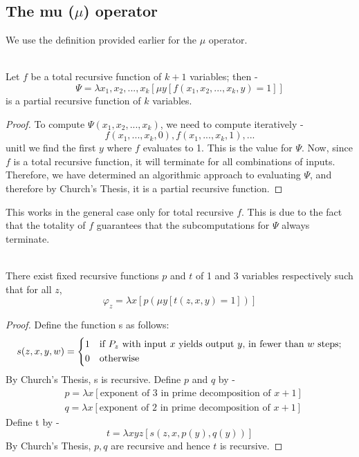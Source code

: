 \documentclass[openany]{book}
\begin{document}
\subsection{The mu ($\mu$) operator}
We use the definition provided earlier for the $\mu$ operator. 
\begin{mytheorem}
     \\ 
    Let $f$ be a total recursive function of $k+1$ variables; then - 
    $$\varPsi = \lambda x_1, x_2, ..., x_k[\mu y[f(x_1, x_2, ..., x_k, y) = 1]]$$
    is a partial recursive function of $k$ variables.
\end{mytheorem}
\begin{proof}
To compute $\varPsi(x_1, x_2, ..., x_k)$, we need to compute iteratively - 
$$f(x_1, ..., x_k, 0), f(x_1, ..., x_k, 1), ...$$
unitl we find the first $y$ where $f$ evaluates to 1. This is the value for $\varPsi$. Now, since $f$ is a total recursive function, it will terminate for all combinations of inputs. Therefore, we have determined an algorithmic approach to evaluating $\varPsi$, and therefore by Church's Thesis, it is a partial recursive function. 
\end{proof}
\begin{mynote}
    This works in the general case only for total recursive $f$. This is due to the fact that the totality of $f$ guarantees that the subcomputations for $\varPsi$ always terminate.  
\end{mynote}
\begin{mytheorem}
     \\
    There exist fixed recursive functions $p$ and $t$ of 1 and 3 variables respectively such that for all $z$, 
    $$\varphi_z = \lambda x[p(\mu y[t(z, x, y) = 1])]$$
\end{mytheorem}
\begin{proof}
    Define the function s as follows:
    $$s(z, x, y, w) = \begin{dcases}
        1 & \text{if $P_z$ with input $x$ yields output $y$, in fewer than $w$ steps;} \\
        0 & \text{otherwise}
    \end{dcases}$$
    By Church's Thesis, s is recursive. Define $p$ and $q$ by - 
    \begin{align*}
        &p = \lambda x[\text{exponent of 3 in prime decomposition of $x+1$}] \\
        &q = \lambda x[\text{exponent of 2 in prime decomposition of $x+1$}] 
    \end{align*}
    Define t by - 
    $$t = \lambda xyz[s(z, x, p(y), q(y))]$$
    By Church's Thesis, $p, q$ are recursive and hence $t$ is recursive.
\end{proof}
\end{document}
